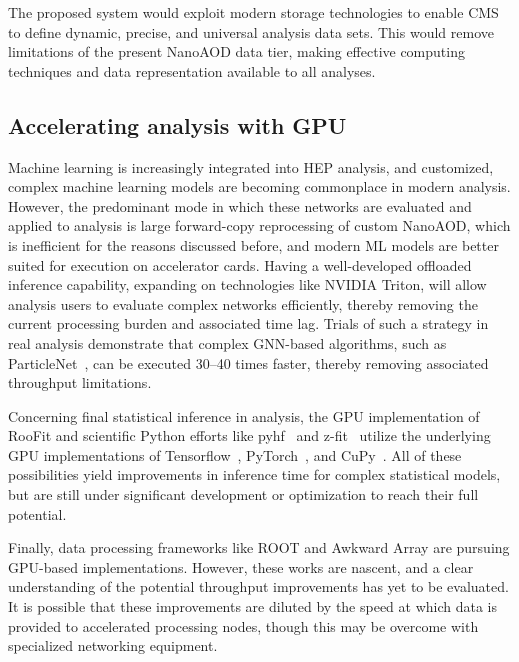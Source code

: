 The proposed system would exploit modern storage technologies to enable CMS to define dynamic, precise, and universal analysis data sets. This would remove limitations of the present NanoAOD data tier, making effective computing techniques and data representation available to all analyses.

\subsection{Accelerating analysis with GPU}
\label{GPU-for-analysis}

Machine learning is increasingly integrated into \gls{HEP} analysis, and customized, complex machine learning models are becoming commonplace in modern analysis. However, the predominant mode in which these networks are evaluated and applied to analysis is large forward-copy reprocessing of custom NanoAOD, which is inefficient for the reasons discussed before, and modern \gls{ML} models are better suited for execution on accelerator cards. Having a well-developed offloaded inference capability, expanding on technologies like NVIDIA Triton, will allow analysis users to evaluate complex networks efficiently, thereby removing the current processing burden and associated time lag. Trials of such a strategy in real analysis demonstrate that complex \gls{GNN}-based algorithms, such as ParticleNet~\cite{particlenetQu_2020}, can be executed 30--40 times faster, thereby removing associated throughput limitations. 


Concerning final statistical inference in analysis, the \gls{GPU} implementation of RooFit and scientific Python efforts like pyhf~\cite{pyhfHeinrich2021} and z-fit~\cite{zfitESCHLE2020100508} utilize the underlying \gls{GPU} implementations of Tensorflow~\cite{tensorflow2015-whitepaper}, PyTorch~\cite{pytorch}, and CuPy~\cite{Okuta2017CuPyA}. All of these possibilities yield improvements in inference time for complex statistical models, but are still under significant development or optimization to reach their full potential. 

Finally, data processing frameworks like \textsc{ROOT} and Awkward Array are pursuing \gls{GPU}-based implementations. However, these works are nascent, and a clear understanding of the potential throughput improvements has yet to be evaluated. It is possible that these improvements are diluted by the speed at which data is provided to accelerated processing nodes, though this may be overcome with specialized networking equipment.

